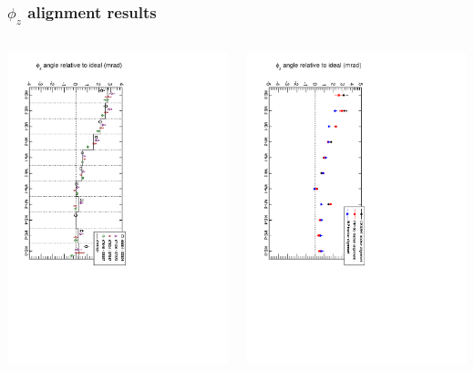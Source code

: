 \documentclass[compress]{beamer}
\begin{document}
\begin{frame}
\frametitle{$\phi_z$ alignment results}

\begin{columns}

\includegraphics[height=\linewidth, angle=90]{alierr_phiz.pdf}

\includegraphics[height=\linewidth, angle=90]{compare_tracker_alignment_phiz.pdf}


\end{columns}
\end{frame}
\end{document}
